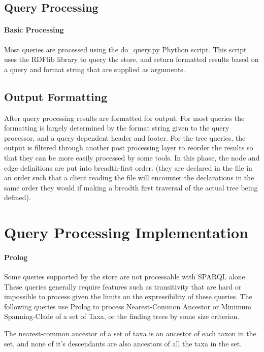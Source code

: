 \documentclass[10pt]{article}
\begin{document}
  \subsection{Query Processing}
     \paragraph{Basic Processing} Most queries are processed using the
do\_query.py Phython script. This script uses the RDFlib library to query the
store, and return formatted results based on a query and format string that are
supplied as arguments.
     
 
  \subsection{Output Formatting}
     After query processing results are formatted for output. For most queries
the formatting is largely determined by the format string given to the query
processor, and a query dependent header and footer.  For the tree queries, the
output is filtered through another post processing layer to reorder the results
so that they can be more easily processed by some tools. In this phase, the
node and edge definitions are put into breadth-first order. (they are declared
in the file in an order such that a client reading the file will encounter the
declarations in the same order they would if making a breadth first traversal
of the actual tree being defined).



\section{Query Processing Implementation}
    \paragraph{Prolog} Some queries supported by the store are not processable
with SPARQL alone. These queries generally require features such as
transitivity that are hard or impossible to process given the limits on the
expressibility of these queries. The following queries use Prolog to process
Nearest-Common Ancestor or Minimum Spanning-Clade of a set of Taxa, or the
finding trees by some size criterion. 

      The nearest-common ancestor of a set of taxa is an ancestor of each taxon
in the set, and none of it's descendants are also ancestors of all the taxa in
the set. 
      
\end{document}
